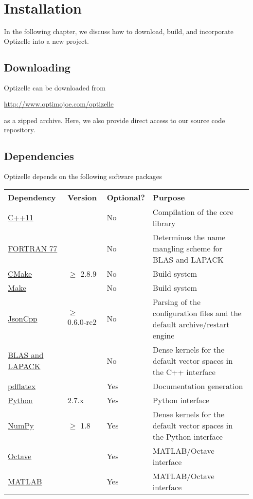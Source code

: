 \documentclass{report}
\begin{document}
\chapter{Installation}\label{ch:Install}

        In the following chapter, we discuss how to download, build, and incorporate Optizelle into a new project.

\section{Downloading}

        Optizelle can be downloaded from
\begin{center}
    \mbox{\url{http://www.optimojoe.com/optizelle}}
\end{center}
as a zipped archive.  Here, we also provide direct access to our source code repository.

\section{Dependencies}

        Optizelle depends on the following software packages
\begin{center}\begin{tabular}{|l|l|l|p{}|}\hline
{\bf Dependency} & {\bf Version} & {\bf Optional?} & {\bf Purpose} \\\hline
\hyperref[tbl:compilers]{C++11} & & No & Compilation of the core library\\\hline
\hyperref[tbl:compilers]{FORTRAN 77} & & No & Determines the name mangling scheme for BLAS and LAPACK\\\hline
\href{http://cmake.org}{CMake} & $\geq$ 2.8.9 & No & Build system\\\hline
\hyperref[tbl:make]{Make} & & No & Build system\\\hline
\href{http://jsoncpp.sourceforge.net}{JsonCpp} & $\geq$ 0.6.0-rc2 & No & Parsing of the configuration files and the default archive/restart engine\\\hline
\hyperref[tbl:blaslapack]{BLAS and LAPACK} & & No & Dense kernels for the default vector spaces in the C++ interface\\\hline
\href{http://www.ctan.org}{pdflatex} & & Yes & Documentation generation \\\hline
\href{http://python.org}{Python} & 2.7.x & Yes & Python interface \\\hline
\href{http://www.numpy.org}{NumPy} & $\geq$ 1.8 & Yes & Dense kernels for the default vector spaces in the Python interface\\\hline
\href{https://www.gnu.org/software/octave}{Octave} & & Yes & MATLAB/Octave interface\\\hline
\href{http://www.mathworks.com/products/matlab}{MATLAB} & & Yes & MATLAB/Octave interface\\\hline
\end{tabular}\end{center}
\end{document}
